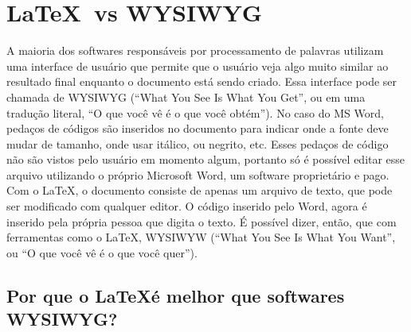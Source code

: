 \documentclass[10pt]{article}
\begin{document}
\section{\LaTeX\ vs WYSIWYG}

A maioria dos softwares responsáveis por processamento de palavras utilizam uma interface de usuário que permite que o usuário veja algo muito similar ao resultado final enquanto o documento está sendo criado. Essa interface pode ser chamada de WYSIWYG (``What You See Is What You Get'', ou em uma tradução literal, ``O que você vê é o que você obtém''). No caso do MS Word, pedaços de códigos são inseridos no documento para indicar onde a fonte deve mudar de tamanho, onde usar itálico, ou negrito, etc. Esses pedaços de código não são vistos pelo usuário em momento algum, portanto só é possível editar esse arquivo utilizando o próprio Microsoft Word, um software proprietário e pago. Com o \LaTeX, o documento consiste de apenas um arquivo de texto, que pode ser modificado com qualquer editor. O código inserido pelo Word, agora é inserido pela própria pessoa que digita o texto. É possível dizer, então, que com ferramentas como o \LaTeX, WYSIWYW (``What You See Is What You Want'', ou ``O que você vê é o que você quer'').


\subsection{Por que o \LaTeX é melhor que softwares WYSIWYG?} 
\end{document}
